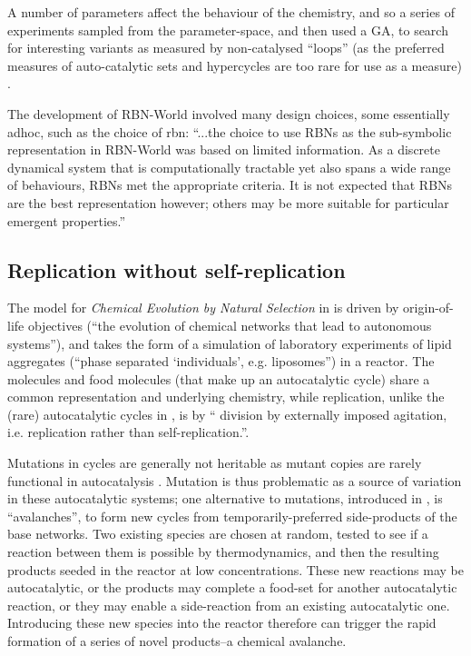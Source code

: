 A number of parameters affect the behaviour of the chemistry, and so a series of experiments sampled from the parameter-space, and then used a GA, to search for interesting variants as measured by non-catalysed ``loops'' (as the preferred measures of auto-catalytic sets and \glspl{hypercycle} are too rare for use as a measure) \parencite[chap.8]{Faulconbridge2011}. 

The development of RBN-World involved many design choices, some essentially adhoc, such as the choice of \gls{rbn}: ``...the choice to use RBNs as the sub-symbolic representation in RBN-World was based on limited information. As a discrete dynamical system that is computationally tractable yet also spans a wide range of behaviours, RBNs met the appropriate criteria. It is not expected that RBNs are the best representation however; others may be more suitable for particular emergent properties.'' \parencite[p. 192]{Faulconbridge2011}

\subsection{Replication without self-replication}

The model for \emph{Chemical Evolution by Natural Selection} in \textcite{Fernando:2007pf, Fernando:2008xy} is driven by origin-of-life objectives (``the evolution of chemical networks that lead to autonomous systems''), and takes the form of a simulation of laboratory experiments of lipid aggregates (``phase separated ‘individuals’, e.g. liposomes'') in a reactor. The molecules and food molecules (that make up an autocatalytic cycle) share a common representation and underlying chemistry, while replication, unlike the (rare) autocatalytic cycles in \textcite{Faulconbridge2011}, is by `` division by externally imposed agitation, i.e. replication rather than self-replication.''.

Mutations in cycles are generally not heritable as mutant copies are rarely functional in autocatalysis \parencite{Vasas2012a}. Mutation is thus problematic as a source of variation in these autocatalytic systems; one alternative to mutations, introduced in \textcite{Fernando:2007pf},  is ``avalanches'', to form new cycles from temporarily-preferred side-products of the base networks. Two existing species are chosen at random, tested to see if a reaction between them is possible by thermodynamics, and then the resulting products seeded in the reactor at low concentrations. These new reactions may be autocatalytic, or the products may complete a food-set for another autocatalytic reaction, or they may enable a side-reaction from an existing autocatalytic one. Introducing these new species into the reactor therefore can trigger the rapid formation of a series of novel products--a chemical avalanche.

